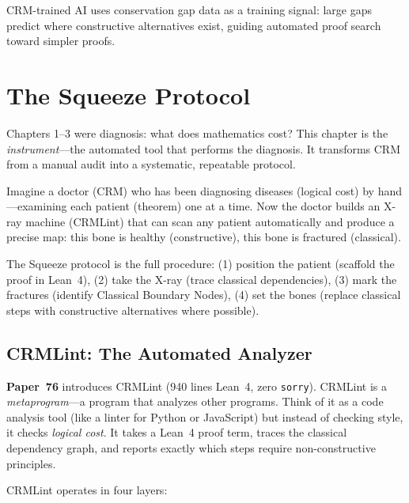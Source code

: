 \documentclass[11pt,twoside,openany]{report}
\theoremstyle{remark}
\newcommand{\paperref}[1]{\textbf{Paper~#1}}
\begin{document}
CRM-trained AI uses conservation gap data as a training signal: large gaps predict where constructive alternatives exist, guiding automated proof search toward simpler proofs.


\chapter{The Squeeze Protocol}

Chapters 1--3 were diagnosis: what does mathematics cost? This chapter is the \emph{instrument}---the automated tool that performs the diagnosis. It transforms CRM from a manual audit into a systematic, repeatable protocol.

\begin{analogybox}
Imagine a doctor (CRM) who has been diagnosing diseases (logical cost) by hand---examining each patient (theorem) one at a time. Now the doctor builds an X-ray machine (CRMLint) that can scan any patient automatically and produce a precise map: this bone is healthy (constructive), this bone is fractured (classical).

The Squeeze protocol is the full procedure: (1) position the patient (scaffold the proof in Lean~4), (2) take the X-ray (trace classical dependencies), (3) mark the fractures (identify Classical Boundary Nodes), (4) set the bones (replace classical steps with constructive alternatives where possible).
\end{analogybox}


\section{CRMLint: The Automated Analyzer}

\paperref{76} introduces CRMLint (940 lines Lean~4, zero \texttt{sorry}). CRMLint is a \emph{metaprogram}---a program that analyzes other programs. Think of it as a code analysis tool (like a linter for Python or JavaScript) but instead of checking style, it checks \emph{logical cost}. It takes a Lean~4 proof term, traces the classical dependency graph, and reports exactly which steps require non-constructive principles.

CRMLint operates in four layers:
\end{document}
